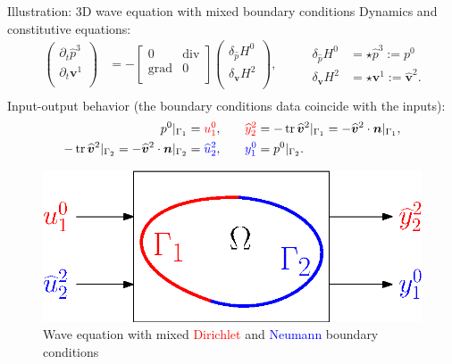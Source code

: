 \documentclass[aspectratio=169]{beamer}
\DeclareMathOperator*{\grad}{grad}
\renewcommand{\div}{\operatorname{div}}
\DeclareMathOperator{\tr}{tr}
\newcommand*{\dual}[1]{\ensuremath{\widehat{#1}}}
\begin{document}
	
	\begin{frame}{Illustration: 3D wave equation with mixed boundary conditions}
		Dynamics and constitutive equations:
		\begin{equation*}
			\begin{aligned}
				\begin{pmatrix}
					\partial_t \dual{p}^3 \\
					\partial_t \bm{v}^1\\
				\end{pmatrix} &= 
				-\begin{bmatrix}
					0 & \div \\
					\grad & 0 \\
				\end{bmatrix}
				\begin{pmatrix}
					\delta_{\dual{p}} H^{0}\\
					\delta_{\bm{v}} H^{2}\\
				\end{pmatrix}, \\
			\end{aligned}	\qquad
			\begin{aligned}
				\delta_{\dual{p}} H^{0} &= \star \dual{p}^3 := p^0\\
				\delta_{\bm{v}} H^{2} &= \star \bm{v}^1:= \dual{\bm{v}}^2. \\
			\end{aligned}
		\end{equation*}
		Input-output behavior (the boundary conditions data coincide with the inputs):
		\begin{equation*}
			\begin{aligned}
				p^0|_{\Gamma_1} &= \textcolor{red}{u^0_1}, \\
				- \tr \dual{\bm{v}}^2|_{\Gamma_2} = -\dual{\bm{v}}^2 \cdot \bm{n}|_{\Gamma_2}  &= \textcolor{blue}{\dual{u}^{2}_2}, \\
			\end{aligned}	\qquad
			\begin{aligned}
				\textcolor{red}{\dual{y}^2_2} &= 	- \tr \dual{\bm{v}}^2 |_{\Gamma_1} = -\dual{\bm{v}}^2\cdot \bm{n}|_{\Gamma_1}, \\
				\textcolor{blue}{y^{0}_1} &= p^0|_{\Gamma_2}.
			\end{aligned}
		\end{equation*}
		
		\begin{figure}
			\centering
			\includegraphics[width=.5\textwidth]{bound_part.eps}
			\caption*{Wave equation with mixed \textcolor{red}{Dirichlet} and \textcolor{blue}{Neumann} boundary conditions}
		\end{figure}
		
	\end{frame}	
	
\end{document}

